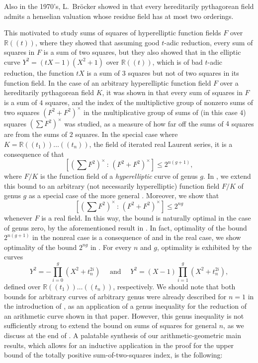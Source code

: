 \documentclass[a4paper,12pt,reqno]{amsart}
\theoremstyle{definition}
\numberwithin{equation}{thm}
\renewcommand{\leq}{\leqslant}
\begin{document}
Also in the 1970's, L.~Br\"ocker showed in \cite{Br76} that every hereditarily pythagorean field admits a henselian valuation whose residue field has at most two orderings. 

This motivated \cite{TVY04} to study sums of squares of hyperelliptic function fields 
$F$ over $\mathbb{R}(\!(t)\!)$, where they showed that assuming good $t$-adic reduction, every sum of squares in $F$  is a sum of two squares, but they also showed that in the elliptic curve $Y^2=(tX-1)(X^2 +1)$ over $\mathbb{R}(\!(t)\!)$, which is of bad $t$-adic reduction, the function $tX$ is a sum of $3$ squares but not of two squares in its function field. 
In the case of an arbitrary hyperelliptic function field $F$ over a  hereditarily pythagorean field $K$, it was shown in \cite{BVG} that every sum of squares in $F$ is a sum of $4$ squares, and the index of the multiplictive group of nonzero sums of two squares $(F^2+F^2)^\times$ in the multiplicative group of sums of (in this case $4$) squares $\left(\sum F^2\right)^\times$ was studied, as a measure of how far off the sums of $4$ squares are from the sums of $2$ squares.
In the special case where $K=\mathbb{R}(\!(t_1)\!)\ldots (\!(t_n)\!)$, the field of iterated real Laurent series, it is a consequence of \cite[Theorem 3.10]{BVG}  that $$ \left[\left(\sum F^2\right)^\times \, : \, (F^2+F^2)^\times \right]  \leq 2^{n(g+1)},$$ where $F/K$ is the function field of a \textit{hyperelliptic} curve of genus $g$.
In , we extend this bound to an arbitrary (not necessarily hyperelliptic) function field $F/K$ of genus $g$ as a special case of the more general . Moreover, we show that $$ \left[\left(\sum F^2\right)^\times \, : \, (F^2+F^2)^\times \right] \leq 2^{ng}$$ whenever $F$ is a real field.  In this way, the bound is naturally optimal in the case of genus zero, by the aforementioned result in \cite{TY03}. In fact, optimality of the bound $2^{n(g+1)}$ in the nonreal case is 
 a consequence of \cite[Example 4.5]{GM24} and in the real case, we show optimality of the bound $2^{ng}$ in .  For every $n$ and $g$, optimality is exhibited by the curves $$Y^2=-\prod_{i=0}^{g}(X^{2}+t_{n}^{2i}) \quad \text{ and } \quad Y^2=(X-1)\prod_{i=1}^{g}(X^{2}+t_{n}^{2i}),$$
defined over $\mathbb{R}(\!(t_1)\!)\ldots (\!(t_n)\!)$, respectively.
We should note that both bounds for arbitrary curves of arbitrary genus were already described for $n=1$ in the introduction of \cite{BG24}, as an application of a genus inequality for the reduction of an arithmetic curve shown in that paper. However, this genus inequality is not sufficiently strong to extend the bound on sums of squares for general $n$, as we discuss at the end of . A palatable synthesis of our arithmetic-geometric main results, which allows for an inductive application in the proof for the upper bound of the totally positive sum-of-two-squares index, is the following:
\end{document}
